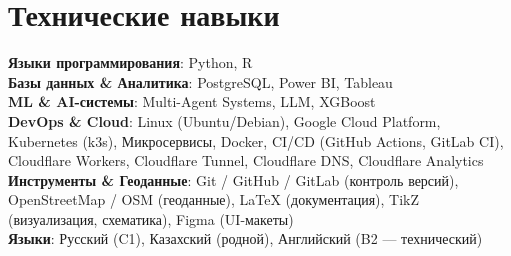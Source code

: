 \documentclass[letterpaper,11pt]{article}
\begin{document}
\section{Технические навыки}
 \begin{itemize}[leftmargin=0.15in, label={}]
    \small{\item{
     \textbf{Языки программирования}{: Python, R} \\
     \textbf{Базы данных \& Аналитика}{: PostgreSQL, Power BI, Tableau} \\
     \textbf{ML \& AI-системы}{: Multi-Agent Systems, LLM, XGBoost} \\
     \textbf{DevOps \& Cloud}{: Linux (Ubuntu/Debian), Google Cloud Platform, Kubernetes (k3s), Микросервисы, Docker, CI/CD (GitHub Actions, GitLab CI), Cloudflare Workers, Cloudflare Tunnel, Cloudflare DNS, Cloudflare Analytics} \\
     \textbf{Инструменты \& Геоданные}{: Git / GitHub / GitLab (контроль версий), OpenStreetMap / OSM (геоданные), LaTeX (документация), TikZ (визуализация, схематика), Figma (UI-макеты)} \\
     \textbf{Языки}{: Русский (C1), Казахский (родной), Английский (B2 — технический)}
    }}
 \end{itemize}


\end{document}
